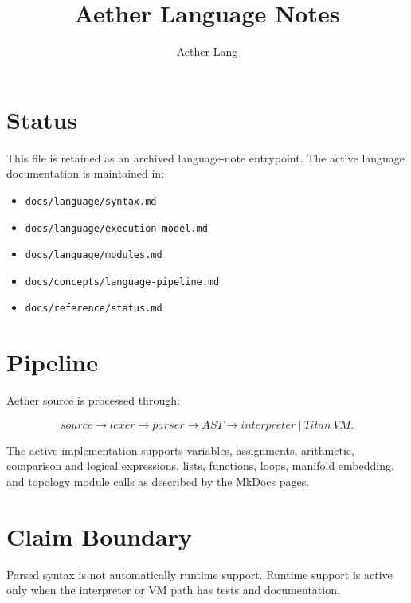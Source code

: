 \documentclass{article}
\title{Aether Language Notes}
\author{Aether Lang}
\date{}
\begin{document}
\maketitle

\section*{Status}

This file is retained as an archived language-note entrypoint. The active
language documentation is maintained in:

\begin{itemize}
  \item \texttt{docs/language/syntax.md}
  \item \texttt{docs/language/execution-model.md}
  \item \texttt{docs/language/modules.md}
  \item \texttt{docs/concepts/language-pipeline.md}
  \item \texttt{docs/reference/status.md}
\end{itemize}

\section*{Pipeline}

Aether source is processed through:

\[
  source \rightarrow lexer \rightarrow parser \rightarrow AST
  \rightarrow interpreter\ |\ Titan\ VM .
\]

The active implementation supports variables, assignments, arithmetic,
comparison and logical expressions, lists, functions, loops, manifold embedding,
and topology module calls as described by the MkDocs pages.

\section*{Claim Boundary}

Parsed syntax is not automatically runtime support. Runtime support is active
only when the interpreter or VM path has tests and documentation.
\end{document}
